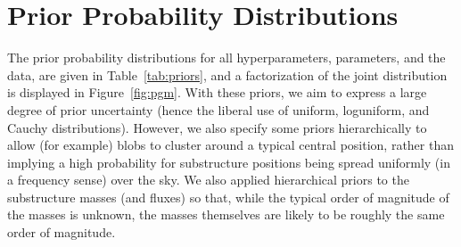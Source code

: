 \documentclass[useAMS,usenatbib]{mn2e}
\begin{document}
\section{Prior Probability Distributions}\label{sec:priors}
The prior probability distributions for all hyperparameters, parameters, and
the data, are given in Table~\ref{tab:priors}, and a factorization of the
joint distribution is displayed in Figure~\ref{fig:pgm}. With these priors,
we aim to express a large degree of prior uncertainty (hence the liberal use
of uniform, loguniform, and Cauchy distributions). However, we also specify
some priors hierarchically to allow (for example)
blobs to cluster around a typical central
position, rather than implying a high probability for substructure positions
being spread uniformly (in a frequency sense) over the sky. We also applied
hierarchical priors to the substructure masses (and fluxes) so that, while
the typical order of magnitude of the masses is unknown, the masses
themselves are likely to be roughly the same order of magnitude.
\end{document}
